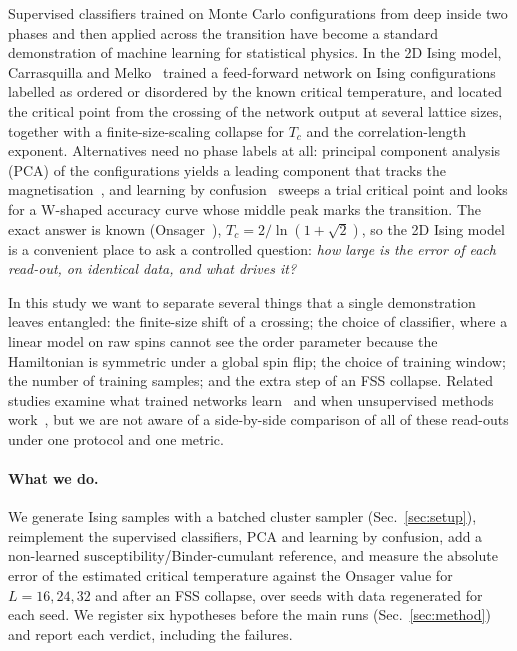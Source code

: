Supervised classifiers trained on Monte Carlo configurations from deep inside two phases and then applied across the transition have become a standard demonstration of machine learning for statistical physics. In the 2D Ising model, Carrasquilla and Melko~\cite{carrasquilla2016machine} trained a feed-forward network on Ising configurations labelled as ordered or disordered by the known critical temperature, and located the critical point from the crossing of the network output at several lattice sizes, together with a finite-size-scaling collapse for $T_c$ and the correlation-length exponent. Alternatives need no phase labels at all: principal component analysis (PCA) of the configurations yields a leading component that tracks the magnetisation~\cite{wang2016discovering,hu2017discovering}, and learning by confusion~\cite{nieuwenburg2016learning} sweeps a trial critical point and looks for a W-shaped accuracy curve whose middle peak marks the transition. The exact answer is known (Onsager~\cite{onsager1944crystal}), $T_c=2/\ln(1+\sqrt2)$, so the 2D Ising model is a convenient place to ask a controlled question: \emph{how large is the error of each read-out, on identical data, and what drives it?}

In this study we want to separate several things that a single demonstration leaves entangled: the finite-size shift of a crossing; the choice of classifier, where a linear model on raw spins cannot see the order parameter because the Hamiltonian is symmetric under a global spin flip; the choice of training window; the number of training samples; and the extra step of an FSS collapse. Related studies examine what trained networks learn~\cite{suchsland2018parameter} and when unsupervised methods work~\cite{hu2017discovering}, but we are not aware of a side-by-side comparison of all of these read-outs under one protocol and one metric.

\paragraph*{What we do.} We generate Ising samples with a batched cluster sampler (Sec.~\ref{sec:setup}), reimplement the supervised classifiers, PCA and learning by confusion, add a non-learned susceptibility/Binder-cumulant reference, and measure the absolute error of the estimated critical temperature against the Onsager value for $L=16,24,32$ and after an FSS collapse, over  seeds with data regenerated for each seed. We register six hypotheses before the main runs (Sec.~\ref{sec:method}) and report each verdict, including the failures.

